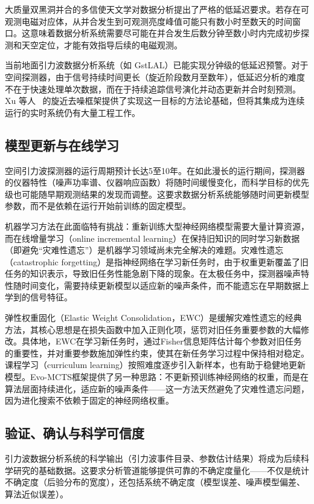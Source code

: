 大质量双黑洞并合的多信使天文学对数据分析提出了严格的低延迟要求。若存在可观测电磁对应体，从并合发生到可观测亮度峰值可能只有数小时至数天的时间窗口。这意味着数据分析系统需要尽可能在并合发生后数分钟至数小时内完成初步探测和天空定位，才能有效指导后续的电磁观测。

当前地面引力波数据分析系统（如 GstLAL）已能实现分钟级的低延迟预警。对于空间探测器，由于信号持续时间更长（旋近阶段数月至数年），低延迟分析的难度不在于快速处理单次数据，而在于持续追踪信号演化并动态更新并合时刻预测。Xu 等人~\cite{xu2024denoising} 的旋近去噪框架提供了实现这一目标的方法论基础，但将其集成为连续运行的实时系统仍有大量工程工作。

\subsection{模型更新与在线学习}

空间引力波探测器的运行周期预计长达5至10年。在如此漫长的运行期间，探测器的仪器特性（噪声功率谱、仪器响应函数）将随时间缓慢变化，而科学目标的优先级也可能随早期观测结果的发现而调整。这要求数据分析系统能够随时间更新模型参数，而不是依赖在运行开始前训练的固定模型。

机器学习方法在此面临特有挑战：重新训练大型神经网络模型需要大量计算资源，而在线增量学习（online incremental learning）在保持旧知识的同时学习新数据（即避免“灾难性遗忘”）是机器学习领域尚未完全解决的难题。灾难性遗忘（catastrophic forgetting）是指神经网络在学习新任务时，由于权重更新覆盖了旧任务的知识表示，导致旧任务性能急剧下降的现象。在太极任务中，探测器噪声特性随时间变化，需要持续更新模型以适应新的噪声条件，而不能遗忘在早期数据上学到的信号特征。

弹性权重固化（Elastic Weight Consolidation，EWC）是缓解灾难性遗忘的经典方法，其核心思想是在损失函数中加入正则化项，惩罚对旧任务重要参数的大幅修改。具体地，EWC在学习新任务时，通过Fisher信息矩阵估计每个参数对旧任务的重要性，并对重要参数施加弹性约束，使其在新任务学习过程中保持相对稳定。课程学习（curriculum learning）按照难度逐步引入新样本，也有助于稳健地更新模型。Evo-MCTS框架提供了另一种思路：不更新预训练神经网络的权重，而是在算法层面持续进化，适应新的噪声条件——这一方法天然避免了灾难性遗忘问题，因为进化搜索不依赖于固定的神经网络权重。

\subsection{验证、确认与科学可信度}

引力波数据分析系统的科学输出（引力波事件目录、参数估计结果）将成为后续科学研究的基础数据。这要求分析管道能够提供可靠的不确定度量化——不仅是统计不确定度（后验分布的宽度），还包括系统不确定度（模型误差、噪声模型偏差、算法近似误差）。

